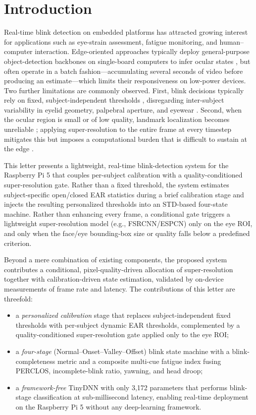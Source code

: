 \documentclass{IEEE_lsens}
\begin{document}
\section{Introduction}
Real-time blink detection on embedded platforms has attracted growing
interest for applications such as eye-strain assessment, fatigue
monitoring, and human--computer interaction. Edge-oriented approaches
typically deploy general-purpose object-detection backbones on
single-board computers to infer ocular states \cite{reddy2017}, but
often operate in a batch fashion---accumulating several seconds of video
before producing an estimate---which limits their responsiveness on
low-power devices. Two further limitations are commonly observed. First,
blink decisions typically rely on fixed, subject-independent thresholds
\cite{soukupova2016}, disregarding inter-subject variability in eyelid
geometry, palpebral aperture, and eyewear \cite{ghoddoosian2019}. Second, when
the ocular region is small or of low quality, landmark localization
becomes unreliable \cite{bulat2018}; applying super-resolution to the
entire frame at every timestep mitigates this but imposes a computational
burden that is difficult to sustain at the edge \cite{dong2016}.

This letter presents a lightweight, real-time blink-detection system for
the Raspberry Pi 5 that couples per-subject calibration with a
quality-conditioned super-resolution gate. Rather than a fixed threshold,
the system estimates subject-specific open/closed EAR statistics during a
brief calibration stage and injects the resulting personalized thresholds
into an STD-based four-state machine. Rather than enhancing every frame,
a conditional gate triggers a lightweight super-resolution model
(e.g., FSRCNN/ESPCN) \cite{dong2016, shi2016} only on the eye ROI, and
only when the face/eye bounding-box size or quality falls below a
predefined criterion.

Beyond a mere combination of existing components, the proposed system
contributes a conditional, pixel-quality-driven allocation of
super-resolution together with calibration-driven state estimation,
validated by on-device measurements of frame rate and latency. The
contributions of this letter are threefold:
\begin{itemize}
\item a \emph{personalized calibration} stage that replaces
subject-independent fixed thresholds with per-subject dynamic EAR
thresholds, complemented by a quality-conditioned super-resolution gate
applied only to the eye ROI;
\item a \emph{four-stage} (Normal--Onset--Valley--Offset) blink state
machine with a blink-completeness metric and a composite multi-cue
fatigue index fusing PERCLOS, incomplete-blink ratio, yawning, and head
droop;
\item a \emph{framework-free} TinyDNN with only 3{,}172 parameters that
performs blink-stage classification at sub-millisecond latency, enabling
real-time deployment on the Raspberry Pi 5 without any deep-learning
framework.
\end{itemize}
\end{document}
